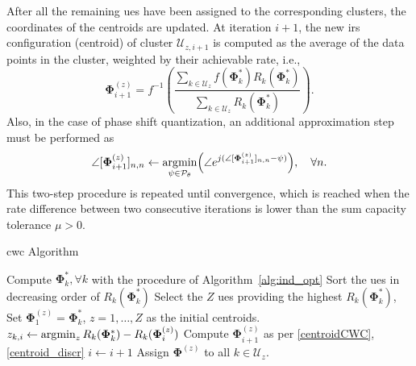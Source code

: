 After all the remaining \glspl{ue} have been assigned to the corresponding clusters, the coordinates of the centroids are updated.
At iteration $i+1$, the new \gls{irs} configuration (centroid) of cluster $\mathcal{U}_{z, i+1}$ is computed as the average of the data points in the cluster, weighted by their achievable rate, i.e.,
\begin{equation}\label{centroidCWC}
    \bm{\Phi}^{(z)}_{i+1} = f^{-1}\left(\frac{\sum_{k \in \mathcal{U}_z}  f(\bm{\Phi}^*_k)R_k(\bm{\Phi}^*_k)}{\sum_{k \in \mathcal{U}_z}R_k(\bm{\Phi}^*_k)}\right).
\end{equation}
Also, in the case of phase shift quantization, an additional approximation step must be performed as
\begin{equation}\label{centroid_discr}
    \angle[\bm{\Phi}^{(z)}_{i+1}]_{n,n} \leftarrow
    \argmin_{\substack{\psi \in \mathcal{P}_{\theta}}}\left(\angle e^{j(\angle[\bm{\Phi}^{(z)}_{i+1}]_{n,n} - \psi)}\right), \quad \forall n.
\end{equation}
This two-step procedure is repeated until convergence, which is reached when the rate difference between two consecutive iterations is lower than the sum capacity tolerance $\mu>0$.

\begin{algorithm}[t]%
\caption{\gls{cwc} Algorithm}\label{alg:clustering_cwc}
\begin{algorithmic}[1]%
{}
\State Compute $\bm{\Phi}^*_k, \forall k$ with the procedure of Algorithm~\ref{alg:ind_opt}
\State Sort the \glspl{ue} in decreasing order of  $R_k(\bm{\Phi}^*_k)$
\State Select the $Z$ \glspl{ue} providing the highest $R_k(\bm{\Phi}^*_k)$,  
\State Set $\bm{\Phi}_1^{(z)} = \bm{\Phi}^*_k$, $z = 1,\ldots, Z$ as the initial centroids.
\Repeat
{}
\State $z_{k, i} \gets \operatorname*{\arg\!\min}_{\substack{z}} R_k(\bm{\Phi}^*_k) - R_k(\bm{\Phi}^{(z)}_{i})$
\EndFor
{}
\State Compute $\bm{\Phi}^{(z)}_{i+1}$ as per \eqref{centroidCWC}, \eqref{centroid_discr}
\EndFor
\State$i \gets i+1$
\State Assign $\bm{\Phi}^{(z)}$ to all $k\in\mathcal{U}_z$.
\end{algorithmic}\normalsize
\end{algorithm}

